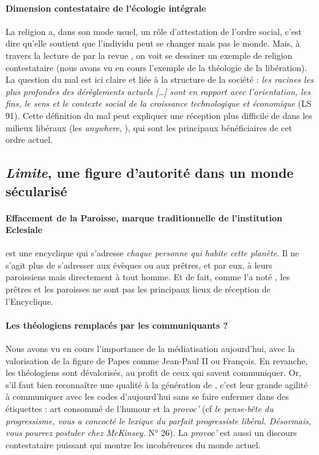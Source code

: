 \paragraph{Dimension contestataire de l'écologie intégrale} La religion a, dans son mode usuel, un rôle d'attestation de l'ordre social, c'est dire qu'elle soutient que l'individu peut se changer mais pas le monde. Mais, à travers la lecture de \LS par la revue \RLimite, on voit se dessiner un exemple de religion contestataire (nous avons vu en cours l'exemple de la théologie de la libération). La question du mal est ici claire et liée à la structure de la société :  \textit{les racines les plus profondes des dérèglements actuels [\ldots] sont en rapport avec l’orientation, les fins, le sens et le contexte social de la croissance technologique et économique} (LS 91). Cette définition du mal peut expliquer une réception plus difficile de \LS dans les milieux libéraux (les \textit{anywhere}, \cite{atlantico_anywhere_2022}), qui sont les principaux bénéficiaires de cet ordre actuel.
 



\subsection{\textit{Limite}, une figure d'autorité dans un monde sécularisé }

\paragraph{Effacement de la Paroisse, marque traditionnelle de l'institution Eclesiale} \LS est une encyclique qui s'adresse \textit{chaque personne qui habite cette planète}. Il ne s'agit plus de s'adresser aux évèques ou aux prêtres, et par eux, à leurs paroissiens mais directement à tout homme. Et de fait, comme l'a noté \cite{revol_reception_2017}, les prêtres et les paroisses ne sont pas les principaux lieux de réception de l'Encyclique.

\paragraph{Les théologiens remplacés par les communiquants ?} Nous avons vu en cours l'importance de la médiatisation aujourd'hui, avec la valorisation de la figure de Papes comme Jean-Paul II ou François. En revanche, les théologiens sont dévalorisés, au profit de ceux qui savent communiquer. Or, s'il faut bien reconnaître une qualité à la génération de \RLimite, c'est leur grande agilité à communiquer avec les codes d'aujourd'hui sans se faire enfermer dans des étiquettes : art consommé de l'humour et la \textit{provoc'} (cf \textit{le pense-bête du progressisme, \RLimite vous a concocté le lexique du parfait progressiste libéral. Désormais, vous pourrez postuler chez McKinsey.} N° 26). La \textit{provoc'} est aussi un discours contestataire puissant qui montre les incohérences du monde actuel. 

